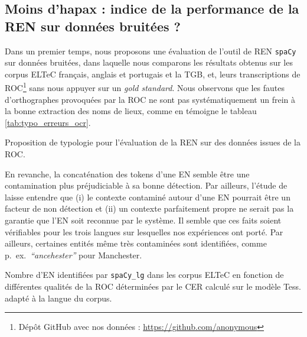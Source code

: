 \subsection{Moins d'hapax : indice de la performance de la REN sur données bruitées ?}
\label{subsec:eval_manu_OCR-IMPACT-NER}
Dans un premier temps, nous proposons une évaluation de l'outil de REN \texttt{spaCy} sur données bruitées, dans laquelle nous comparons les résultats obtenus sur les corpus ELTeC français, anglais et portugais et la TGB, et, leurs transcriptions de ROC\footnote{Dépôt GitHub avec nos données : \url{https://github.com/anonymous}} sans nous appuyer sur un \textit{gold standard}. Nous observons que les fautes d'orthographes provoquées par la ROC ne sont pas systématiquement un frein à la bonne extraction des noms de lieux, comme en témoigne le tableau \ref{tab:typo_erreurs_ocr}.
\begin{table}[h!]
\small
    \centering
   
    \caption{Proposition de typologie pour l'évaluation de la REN sur des données issues de la ROC.}
    \label{tab:typo_erreurs_ocr}
\end{table}

En revanche, la concaténation des tokens d'une EN semble être une contamination plus préjudiciable à sa bonne détection. Par ailleurs, l'étude de \cite{DBLP:conf/gis/Koudoro-Parfait21} laisse entendre que (i) le contexte contaminé autour d'une EN pourrait être un facteur de non détection et (ii) un contexte parfaitement propre ne serait pas la garantie que l'EN soit reconnue par le système. Il semble que ces faits soient vérifiables pour les trois langues sur lesquelles nos expériences ont porté. Par ailleurs, certaines entités même très contaminées sont identifiées, comme p.\ ex.\  \textit{``ancehester''} pour \og{}Manchester\fg{}. 


\begin{table}[h!]
    \centering
    \small
    
    \caption{Nombre d'EN identifiées par \texttt{spaCy\_lg} dans les corpus ELTeC  en fonction de différentes qualités de la ROC déterminées par le CER calculé sur le modèle Tess. adapté à la langue du corpus. 
    }
    \label{tab:ELTeC_bon_mauvais}
\end{table}

